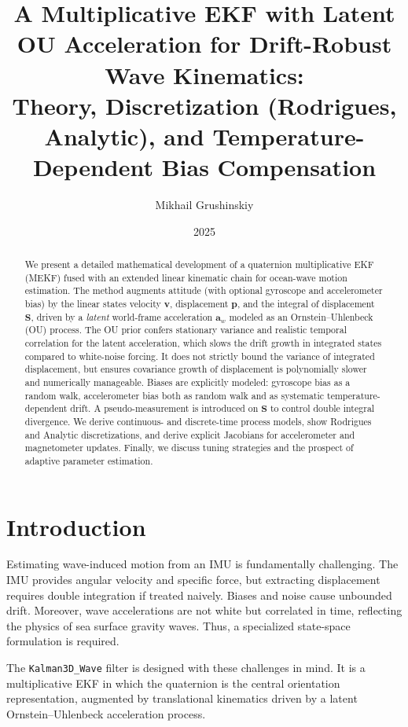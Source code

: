 \documentclass[10pt]{extarticle}
\title{A Multiplicative EKF with Latent OU Acceleration for Drift-Robust Wave Kinematics: \\
Theory, Discretization (Rodrigues, Analytic), and Temperature-Dependent Bias Compensation}
\author{Mikhail Grushinskiy}
\date{2025}
\begin{document}
\maketitle

\begin{abstract}
We present a detailed mathematical development of a quaternion multiplicative EKF (MEKF) fused with an extended 
linear kinematic chain for ocean-wave motion estimation. 
The method augments attitude (with optional gyroscope and accelerometer bias) by the linear states velocity $\bm v$, displacement $\bm p$, 
and the integral of displacement $\bm S$, driven by a \emph{latent} world-frame acceleration $\bm a_w$ modeled as an Ornstein--Uhlenbeck (OU) process. The OU prior confers stationary variance and realistic temporal correlation for the latent acceleration, which slows the drift growth in integrated states compared to white-noise forcing. It does not strictly bound the variance of integrated displacement, but ensures covariance growth of displacement is polynomially slower and numerically manageable.
Biases are explicitly modeled: gyroscope bias as a random walk, accelerometer bias both as random walk and as systematic temperature-dependent drift. 
A pseudo-measurement is introduced on $\bm S$ to control double integral divergence. 
We derive continuous- and discrete-time process models, show Rodrigues and Analytic discretizations, and derive explicit Jacobians for accelerometer and magnetometer updates. 
Finally, we discuss tuning strategies and the prospect of adaptive parameter estimation.
\end{abstract}

\section{Introduction}
Estimating wave-induced motion from an IMU is fundamentally challenging. The IMU provides angular velocity and specific force, 
but extracting displacement requires double integration if treated naively. Biases and noise cause unbounded drift. 
Moreover, wave accelerations are not white but correlated in time, reflecting the physics of sea surface gravity waves. 
Thus, a specialized state-space formulation is required. 

The \texttt{Kalman3D\_Wave} filter is designed with these challenges in mind. 
It is a multiplicative EKF in which the quaternion is the central orientation representation, 
augmented by translational kinematics driven by a latent Ornstein--Uhlenbeck acceleration process. 
\end{document}
